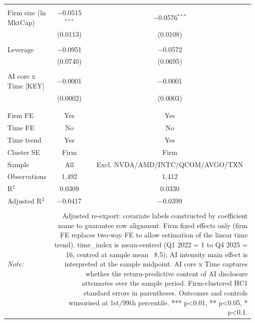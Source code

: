 \begin{table}[!htbp]
\begin{tabular}{@{\extracolsep{5pt}}lcc}
  & & \\ 
 Firm size (ln MktCap) & $-$0.0515$^{***}$ & $-$0.0576$^{***}$ \\ 
  & (0.0113) & (0.0108) \\ 
  & & \\ 
 Leverage & $-$0.0951 & $-$0.0572 \\ 
  & (0.0740) & (0.0695) \\ 
  & & \\ 
 AI core x Time  [KEY] & $-$0.0001 & $-$0.0001 \\ 
  & (0.0002) & (0.0003) \\ 
  & & \\ 
\hline \\[-1.8ex] 
Firm FE & Yes & Yes \\ 
Time FE & No & No \\ 
Time trend & Yes & Yes \\ 
Cluster SE & Firm & Firm \\ 
Sample & All & Excl. NVDA/AMD/INTC/QCOM/AVGO/TXN \\ 
Observations & 1,492 & 1,412 \\ 
R$^{2}$ & 0.0309 & 0.0330 \\ 
Adjusted R$^{2}$ & $-$0.0417 & $-$0.0399 \\ 
\hline 
\hline \\[-1.8ex] 
\textit{Note:}  & \multicolumn{2}{r}{Adjusted re-export: covariate labels constructed by coefficient name to guarantee row alignment. Firm fixed effects only (firm FE replaces two-way FE to allow estimation of the linear time trend). time_index is mean-centred (Q1 2022 = 1 to Q4 2025 = 16, centred at sample mean ~8.5); AI intensity main effect is interpreted at the sample midpoint. AI core x Time captures whether the return-predictive content of AI disclosure attenuates over the sample period. Firm-clustered HC1 standard errors in parentheses. Outcomes and controls winsorised at 1st/99th percentile. *** p<0.01, ** p<0.05, * p<0.1.} \\ 
\end{tabular} 
\end{table} 
